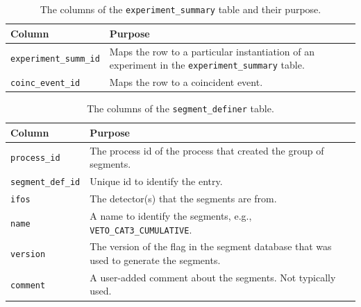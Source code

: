 \begin{table}[p]
\label{tab:experiment_map}
\center
\begin{tabular}{ l | p{10cm}}
Column      &   Purpose     \\
\hline \hline
\texttt{experiment\_summ\_id}   &   Maps the row to a particular instantiation of an experiment in the \texttt{experiment\_summary} table. \\
\hline
\texttt{coinc\_event\_id}   &   Maps the row to a coincident event.
\end{tabular}
\caption{The columns of the \texttt{experiment\_summary} table and their purpose.}
\end{table}

\pagebreak

\begin{table}[p]
\label{tab:segment_definer}
\center
\begin{tabular}{ l | p{10cm}}
Column      &   Purpose     \\
\hline \hline
\texttt{process\_id}    &   The process id of the process that created the group of segments. \\
\hline
\texttt{segment\_def\_id}   &   Unique id to identify the entry. \\
\hline
\texttt{ifos}   &   The detector(s) that the segments are from. \\
\hline
\texttt{name}   &   A name to identify the segments, e.g., \texttt{VETO\_CAT3\_CUMULATIVE}. \\
\hline
\texttt{version}    &   The version of the flag in the segment database that was used to generate the segments. \\
\hline
\texttt{comment}    &   A user-added comment about the segments. Not typically used.
\end{tabular}
\caption{The columns of the \texttt{segment\_definer} table.}
\end{table}

